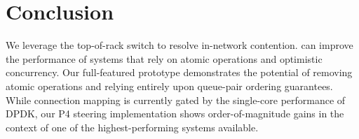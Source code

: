 \section{Conclusion}

We leverage the top-of-rack switch to resolve in-network contention.
{\sword} can improve the performance of systems that rely on atomic
operations and optimistic concurrency. Our full-featured prototype
demonstrates the potential of removing atomic operations and relying
entirely upon queue-pair ordering guarantees.  While connection
mapping is currently gated by the single-core performance of DPDK, our
P4 steering implementation shows order-of-magnitude gains in the
context of one of the highest-performing systems available.

